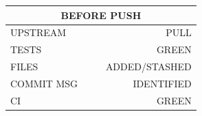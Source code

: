 \documentclass[10pt]{article}
\newenvironment{checklist}[1]{%
  \renewcommand{\item}[2]{
    \uppercase{##1}\dotfill&\dotfill\uppercase{##2}\\ 
  }
  \renewcommand{\tabcolsep}{0em}
  \begin{tabular}{p{0.5\linewidth}r}
     \toprule
       \multicolumn{2}{c}{\textbf{\uppercase{#1}}}\\
     \midrule
}{\bottomrule\end{tabular}}
\begin{document}
\begin{checklist}{before push}
  \item{upstream}{pull}
  \item{tests}{green}
  \item{files}{added/stashed}
  \item{commit msg}{identified}
  \item{ci}{green}
\end{checklist}
\end{document}
